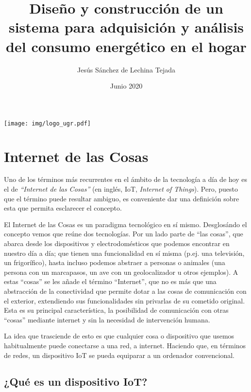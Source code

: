 \documentclass[a4paper,10pt]{article}
\title{Diseño y construcción de un sistema para adquisición y análisis
  del consumo energético en el hogar}
\author{Jesús Sánchez de Lechina Tejada}
\date{Junio 2020}
\begin{document}
\maketitle
\thispagestyle{empty}
\begin{center}
  \texttt{[image: img/logo\_ugr.pdf]}
\end{center}

\newpage

\tableofcontents

\newpage

\section{Internet de las Cosas}\label{internet-de-las-cosas}

Uno de los términos más recurrentes en el ámbito de la tecnología a día
de hoy es el de \textit{``Internet de las Cosas''} (en inglés, IoT, \textit{Internet of
Things}). Pero, puesto que el término puede resultar ambiguo, es
conveniente dar una definición sobre esta que permita esclarecer el
concepto.

El Internet de las Cosas es un paradigma tecnológico en sí mismo.
Desglosándo el concepto vemos que reúne dos tecnologías. Por un lado
parte de ``las cosas'', que abarca desde los dispositivos y
electrodomésticos que podemos encontrar en nuestro día a día; que tienen
una funcionalidad en sí misma (p.ej. una televisión, un frigorífico),
hasta incluso podemos abstraer a personas o animales (una persona con un
marcapasos, un ave con un geolocalizador u otros
ejemplos\cite{iotagendawebsiteWhatInternetThings}). A estas ``cosas''
se les añade el término
``Internet'', que no es más que una abstracción de la conectividad que
permite dotar a las cosas de comunicación con el exterior, extendiendo
sus funcionalidades sin privarlas de su cometido original. Esta es
su principal característica, la posibilidad de comunicación con otras
``cosas'' mediante internet y sin la necesidad de intervención humana.

La idea que trasciende de esto es que cualquier cosa o dispositivo que
usemos habitualmente puede conectarse a una red, a internet. Haciendo
que, en términos de redes, un dispositivo IoT se pueda equiparar a un
ordenador convencional.

\subsection{¿Qué es un dispositivo
IoT?}\label{quuxe9-es-un-dispositivo-iot}
\end{document}

